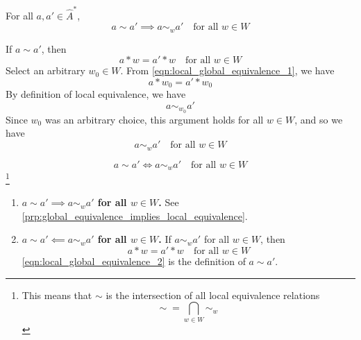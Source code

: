 \begin{propositionE}\label{prp:global_equivalence_implies_local_equivalence}
    For all $a, a' \in \hat{A}^{*}$,
    \begin{equation}
        a \sim a' \implies a \sim_{w} a' \quad \text{for all $w \in W$}
    \end{equation}
\end{propositionE}
\begin{proofE}
    If $a \sim a'$, then
    \begin{equation}
        \label{eqn:local_global_equivalence_1}
        a \ast w = a' \ast w \quad \text{for all $w \in W$}
    \end{equation}
    Select an arbitrary $w_{0} \in W$.
    From \cref{eqn:local_global_equivalence_1}, we have
    \begin{equation}
        a \ast w_{0} = a' \ast w_{0}
    \end{equation}
    By definition of local equivalence, we have
    \begin{equation}
        a \sim_{w_{0}} a'
    \end{equation}
    Since $w_{0}$ was an arbitrary choice, this argument holds for all $w \in W$, and so we have
    \begin{equation}
        a \sim_{w} a' \quad \text{for all $w \in W$}
    \end{equation}
\end{proofE}


\begin{propositionE}\label{prp:gloabal_equivalence_is_local_equivalence_on_all_world_states}
    \begin{equation}
        a \sim a' \iff a \sim_{w} a' \quad \text{for all $w \in W$}
    \end{equation}
    \footnote{
    This means that $\sim$ is the intersection of all local equivalence relations
    \begin{equation}
        \sim \; = \bigcap_{w \in W} \sim_{w}
    \end{equation}
    }
\end{propositionE}
\begin{proofE}
\begin{enumerate}
    \item \textbf{$a \sim a' \implies a \sim_{w} a'$ for all $w \in W$.}
    See \cref{prp:global_equivalence_implies_local_equivalence}.

    \item \textbf{$a \sim a' \impliedby a \sim_{w} a'$ for all $w \in W$.}
    If $a \sim_{w} a'$ for all $w \in W$, then
    \begin{equation}
        \label{eqn:local_global_equivalence_2}
        a \ast w = a' \ast w \quad \text{for all $w \in W$}
    \end{equation}
    \cref{eqn:local_global_equivalence_2} is the definition of $a \sim a'$.
\end{enumerate}
\end{proofE}

